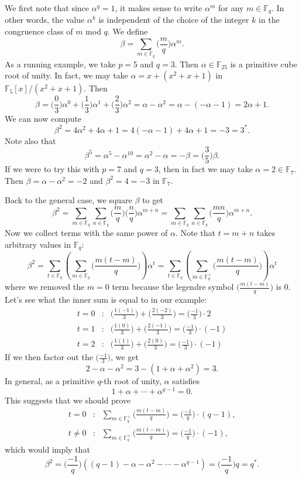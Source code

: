 \documentclass{article}
\def\F{{\mathbb F}}
\def\F{{\mathbb F}}
\renewcommand{\lg}[2]{\Big(\frac{#1}{#2}\Big)}
\newcommand{\leg}[2]{\Big(\frac{#1}{#2}\Big)}
\begin{document}
We first note that since $\alpha^q = 1$, it makes sense to write $\alpha^m$ for any $m\in\F_q$. In other words, the value $\alpha^k$ is independent of the choice of the integer $k$ in the congruence class of $m$ mod $q$. We define
$$\beta = \sum_{m\in\F_q} \lg{m}{q}\alpha^m.$$
As a running example, we take $p = 5$ and $q = 3$. Then $\alpha\in\F_{25}$ is a primitive cube root of unity. In fact, we may take $\alpha = x + (x^2 + x + 1)$ in $\F_5[x]/(x^2 + x + 1).$ Then
$$\beta = \lg{0}{3}\alpha^0 + \lg{1}{3}\alpha^1 + \lg{2}{3}\alpha^2 = \alpha - \alpha^2 = \alpha - (-\alpha - 1) = 2\alpha + 1.$$
We can now compute $$\beta^2 = 4\alpha^2 + 4\alpha + 1 = 4(-\alpha-1) + 4\alpha + 1 = -3 = 3^*.$$
Note also that
$$\beta^5 = \alpha^5 - \alpha^{10} = \alpha^2 - \alpha = -\beta = \lg{3}{5}\beta.$$
If we were to try this with $p = 7$ and $q = 3$, then in fact we may take $\alpha = 2 \in\F_7.$ Then $\beta = \alpha - \alpha^2 = -2$ and $\beta^2 = 4 = -3$ in $\F_7$.

Back to the general case, we square $\beta$ to get
$$\beta^2 = \sum_{m\in\F_q}\sum_{n\in\F_q}\leg{m}{q}\lg{n}{q}\alpha^{m+n} = \sum_{m\in\F_q}\sum_{n\in\F_q}\leg{mn}{q}\alpha^{m+n}.$$
Now we collect terms with the same power of $\alpha$. Note that $t=m+n$ takes arbitrary values in $\F_q$:
$$\beta^2 = \sum_{t\in\F_q} \left(\sum_{m\in\F_q} \lg{m(t-m)}{q}\right)\alpha^t = \sum_{t\in\F_q} \left(\sum_{m\in\F_q^\times} \lg{m(t-m)}{q}\right)\alpha^t$$ where we removed the $m = 0$ term because the legendre symbol $\leg{m(t-m)}{q}$ is $0$. Let's see what the inner sum is equal to in our example:
\begin{eqnarray*}
    t=0&\colon& \lg{1(-1)}{3} + \lg{2(-2)}{3} = \lg{-1}{3}\cdot 2\\
    t=1&\colon& \lg{1(0)}{3} + \lg{2(-1)}{3} = \lg{-1}{3}\cdot (-1)\\
    t=2&\colon& \lg{1(1)}{3} + \lg{2(0)}{3} = \lg{-1}{3}\cdot (-1)
\end{eqnarray*}
If we then factor out the $\lg{-1}{3}$, we get
$$2 - \alpha - \alpha^2 = 3 - (1 + \alpha + \alpha^2) = 3.$$
In general, as a primitive $q$-th root of unity, $\alpha$ satisfies $$1 + \alpha + \cdots + \alpha^{q-1} = 0.$$
This suggests that we should prove
\begin{eqnarray*}
    t=0&\colon& \sum_{m\in\F_q^\times} \lg{m(t-m)}{q} = \lg{-1}{q}\cdot (q-1),\\
    t\neq 0&\colon& \sum_{m\in\F_q^\times} \lg{m(t-m)}{q} = \lg{-1}{q}\cdot (-1),
\end{eqnarray*}
which would imply that
$$\beta^2 = \lg{-1}{q}\left((q-1) - \alpha - \alpha^2 - \cdots - \alpha^{q-1}\right) = \lg{-1}{q}q = q^*.$$
\end{document}

